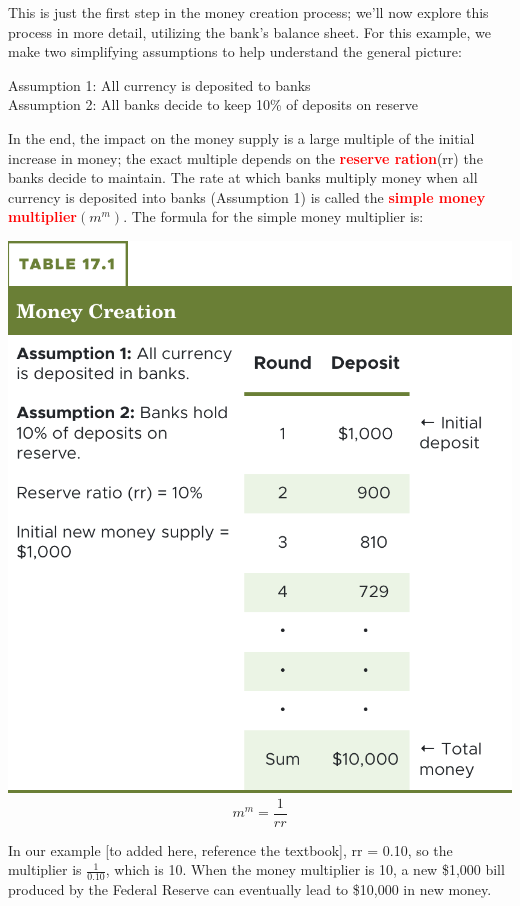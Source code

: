 \documentclass[11pt]{article} %
\begin{document}
This is just the first step in the money creation process; we'll now explore this process in more detail, utilizing the bank's balance sheet. For this example, we make two simplifying assumptions to help understand the general picture:\\
\begin{center}
\noindent\begin{minipage}{\linewidth}
\centering
Assumption 1: All currency is deposited to banks\\
Assumption 2: All banks decide to keep 10\% of deposits on reserve
\end{minipage}
\end{center}
In the end, the impact on the money supply is a large multiple of the initial increase in money; the exact multiple depends on the \textbf{\textcolor{red}{reserve ration}}(rr) the banks decide to maintain. The rate at which banks multiply money when all currency is deposited into banks (Assumption 1) is called the \textbf{\textcolor{red}{simple money multiplier}}$(m^m)$. The formula for the simple money multiplier is:
\begin{center}
\includegraphics[scale=0.5]{images/Table 17.1.png}
\begin{equation}
m^m = \frac{1}{rr}
\end{equation}
\end{center}
In our example [to added here, reference the textbook], rr = 0.10, so the multiplier is $\frac{1}{0.10}$, which is 10. When the money multiplier is 10, a new \$1,000 bill produced by the Federal Reserve can eventually lead to \$10,000 in new money.
\end{document}
